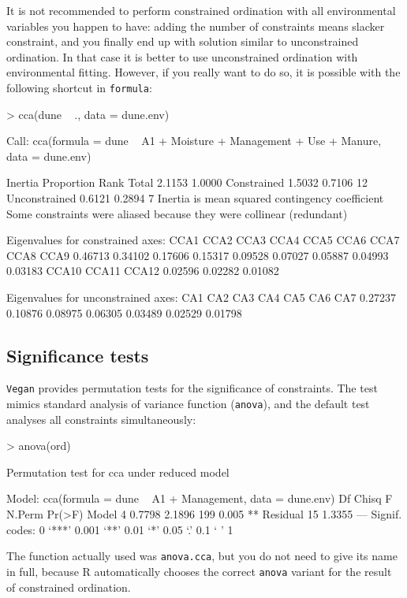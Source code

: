 \documentclass[a4paper,10pt]{amsart}
\begin{document}
It is not recommended to perform constrained ordination with all
environmental variables you happen to have: adding the number of
constraints means slacker constraint, and you finally end up with
solution similar to unconstrained ordination. In that case it is
better to use unconstrained ordination with environmental fitting.
However, if you really want to do so, it is possible with the
following shortcut in \texttt{formula}:
\begin{Schunk}
\begin{Sinput}
> cca(dune ~ ., data = dune.env)
\end{Sinput}
\begin{Soutput}
Call: cca(formula = dune ~ A1 + Moisture + Management + Use +
Manure, data = dune.env)

              Inertia Proportion Rank
Total          2.1153     1.0000     
Constrained    1.5032     0.7106   12
Unconstrained  0.6121     0.2894    7
Inertia is mean squared contingency coefficient 
Some constraints were aliased because they were collinear (redundant)

Eigenvalues for constrained axes:
   CCA1    CCA2    CCA3    CCA4    CCA5    CCA6    CCA7    CCA8    CCA9 
0.46713 0.34102 0.17606 0.15317 0.09528 0.07027 0.05887 0.04993 0.03183 
  CCA10   CCA11   CCA12 
0.02596 0.02282 0.01082 

Eigenvalues for unconstrained axes:
    CA1     CA2     CA3     CA4     CA5     CA6     CA7 
0.27237 0.10876 0.08975 0.06305 0.03489 0.02529 0.01798 
\end{Soutput}
\end{Schunk}

\subsection{Significance tests}

\texttt{Vegan} provides permutation tests for the significance of
constraints.  The test mimics standard analysis of variance function
(\texttt{anova}), and the default test analyses all constraints
simultaneously:
\begin{Schunk}
\begin{Sinput}
> anova(ord)
\end{Sinput}
\begin{Soutput}
Permutation test for cca under reduced model

Model: cca(formula = dune ~ A1 + Management, data = dune.env)
         Df  Chisq      F N.Perm Pr(>F)   
Model     4 0.7798 2.1896    199  0.005 **
Residual 15 1.3355                        
---
Signif. codes:  0 ‘***’ 0.001 ‘**’ 0.01 ‘*’ 0.05 ‘.’ 0.1 ‘ ’ 1 
\end{Soutput}
\end{Schunk}
The function actually used was \texttt{anova.cca}, but you do not need
to give its name in full, because \textsf{R} automatically chooses the
correct \texttt{anova} variant for the result of constrained
ordination.
\end{document}
